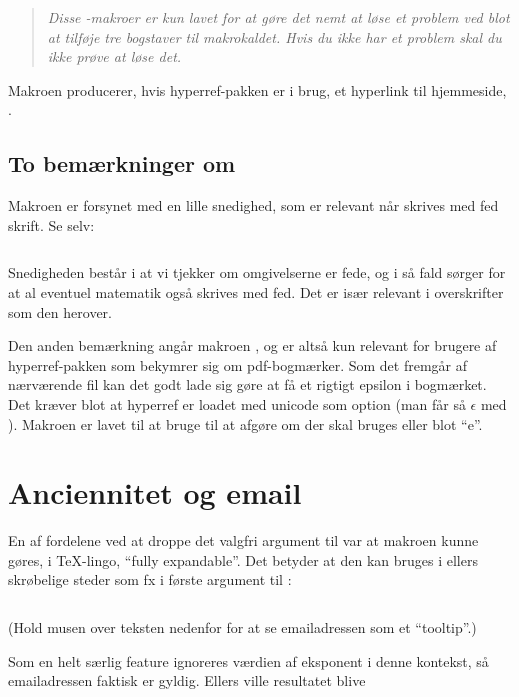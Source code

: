 \documentclass[a4paper,article,oneside,danish]{memoir}
\newcommand{\pakkenavn}[1]{\textsf{#1}}
\newcommand*{\optionname}[1]{\textcolor{option}{#1}}
\newcommand{\mdframedinputminted}[2]{\begin{mdframed}[style=kodestyle]\inputminted{#1}{#2}\end{mdframed}}
\begin{document}
\begin{quote}
  \itshape  Disse -makroer er kun lavet for at gøre det nemt at løse
  et problem ved blot at tilføje tre bogstaver til makrokaldet. Hvis
  du ikke har et problem skal du ikke prøve at løse det.
\end{quote}

Makroen  producerer, hvis \pakkenavn{hyperref}-pakken er i
brug, et hyperlink til \TKETs hjemmeside, \TKurl.

\subsection{To bemærkninger om \RemToRpdf}
\label{sec:bemarkn-om-remt}

Makroen  er forsynet med en lille snedighed, som er
relevant når \RemToR skrives med fed skrift. Se selv:
\mdframedinputminted{latex}{eksempel-RemToR.tex}

\begin{resultat}

\end{resultat}

Snedigheden består i at vi tjekker om omgivelserne er fede, og i så
fald sørger for at al eventuel matematik også skrives med fed. Det er
især relevant i overskrifter som den herover.

Den anden bemærkning angår makroen , og er altså kun
relevant for brugere af \pakkenavn{hyperref}-pakken som bekymrer sig
om pdf-bogmærker. Som det fremgår af nærværende fil kan det godt lade
sig gøre at få et rigtigt epsilon i bogmærket. Det kræver blot at
\pakkenavn{hyperref} er loadet med \optionname{unicode} som option
(man får så $\epsilon$ med ). Makroen 
er lavet til at bruge  til at afgøre om der skal
bruges  eller blot \enquote{e}.

\section{Anciennitet og email}
\label{sec:anciennitet-og-email}

En af fordelene ved at droppe det valgfri argument til 
var at makroen kunne gøres, i \TeX-lingo, \enquote{fully expandable}. Det
betyder at den kan bruges i ellers skrøbelige steder som fx i første
argument til :
\mdframedinputminted{latex}{eksempel-href.tex}
(Hold musen over teksten nedenfor for at se emailadressen som et \enquote{tooltip}.)
\begin{resultat}

\end{resultat}
Som en helt særlig feature ignoreres værdien af \optionname{eksponent}
i denne kontekst, så emailadressen faktisk er gyldig. Ellers ville
resultatet blive
\begin{resultat}

\end{resultat}
\end{document}
